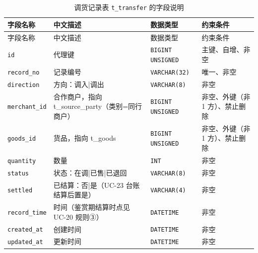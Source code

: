 \documentclass[12pt, a4paper]{ctexart}
\newcommand{\code}[1]{\texttt{\small #1}}
\begin{document}
\begin{longtable}{@{}p{3.1cm} p{4.5cm} p{2.4cm} p{4.5cm}@{}}
\caption{调货记录表 \code{t\_transfer} 的字段说明}\label{tab:f-t-transfer}\\
\toprule
字段名称 & 中文描述 & 数据类型 & 约束条件 \\
\midrule
\endfirsthead
\toprule
字段名称 & 中文描述 & 数据类型 & 约束条件 \\
\midrule
\endhead
\bottomrule
\endlastfoot
\code{id} & 代理键 & \code{BIGINT UNSIGNED} & 主键、自增、非空 \\
\code{record\_no} & 记录编号 & \code{VARCHAR(32)} & 唯一、非空 \\
\code{direction} & 方向：调入|调出 & \code{VARCHAR(8)} & 非空 \\
\code{merchant\_id} & 合作商户，指向 t\_source\_party（类别=同行商户） & \code{BIGINT UNSIGNED} & 非空、外键（非 1 方）、禁止删除 \\
\code{goods\_id} & 货品，指向 t\_goods & \code{BIGINT UNSIGNED} & 非空、外键（非 1 方）、禁止删除 \\
\code{quantity} & 数量 & \code{INT} & 非空 \\
\code{status} & 状态：在调|已售|已退回 & \code{VARCHAR(8)} & 非空 \\
\code{settled} & 已结算：否|是（UC-23 台账结算后置是） & \code{VARCHAR(4)} & 非空 \\
\code{record\_time} & 时间（鉴赏期结算时点见 UC-20 规则③） & \code{DATETIME} & 非空 \\
\code{created\_at} & 创建时间 & \code{DATETIME} & 非空 \\
\code{updated\_at} & 更新时间 & \code{DATETIME} & 非空 \\
\end{longtable}
\end{document}

